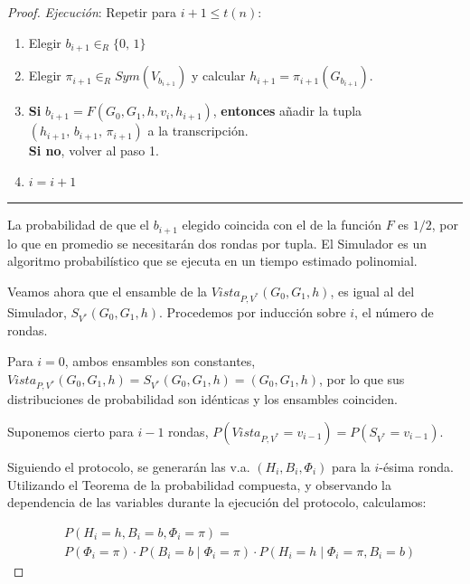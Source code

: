 \begin{proof}
	\textit{Ejecución}: Repetir para $i+1 \leq t(n)$:
	
	\begin{enumerate}
		\item Elegir $b_{i+1} \in_R \{0,\,1\}$
		
		\item Elegir $\pi_{i+1} \in_R Sym(V_{b_{i+1}})$ y calcular $h_{i+1}=\pi_{i+1}(G_{b_{i+1}})$.
		
		\item \textbf{Si} $b_{i+1} = F(G_0,G_1,h,v_i,h_{i+1})$, \textbf{entonces} añadir la tupla \\ $(h_{i+1},\,b_{i+1},\,\pi_{i+1})$ a la transcripción. \\
		\textbf{Si no}, volver al paso 1.
		
		\item $i = i+1$
		
	\end{enumerate}
	
	\rule{\textwidth}{1pt}
	
	\hfill
	
	
	La probabilidad de que el $b_{i+1}$ elegido coincida con el de la función $F$ es $1/2$, por lo que en promedio se necesitarán dos rondas por tupla. El Simulador es un algoritmo probabilístico que se ejecuta en un tiempo estimado polinomial.
	
	\hfil
	
	Veamos ahora que el ensamble de la $Vista_{P,V^*}(G_0, G_1 ,h)$, es igual al del Simulador, $S_{V^*}(G_0, G_1 ,h)$. Procedemos por inducción sobre $i$, el número de rondas.
	
	Para $i=0$, ambos ensambles son constantes, $Vista_{P,V^*}(G_0, G_1 ,h) = S_{V^*}(G_0, G_1 ,h) = (G_0, G_1, h)$, por lo que sus distribuciones de probabilidad son idénticas y los ensambles coinciden.
	
	Suponemos cierto para $i-1$ rondas, $P(Vista_{P,V^*}=v_{i-1}) = P(S_{V^*}=v_{i-1})$.
	
	\hfil
	
	Siguiendo el protocolo, se generarán las v.a. $(H_i, B_i, \Phi_i)$ para la $i$-ésima ronda. Utilizando el Teorema de la probabilidad compuesta, y observando la dependencia de las variables durante la ejecución del protocolo, calculamos:
	
	\begin{align*}
	& P(H_i=h, B_i=b, \Phi_i = \pi) = \\
	& P(\Phi_i = \pi) \cdot P(B_i = b \mid \Phi_i = \pi) \cdot P(H_i = h \mid \Phi_i = \pi, B_i=b)
	\end{align*}


\end{proof}
